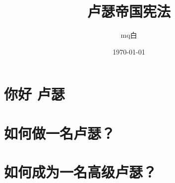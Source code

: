 \documentclass[UTF8,11pt,a4paper]{ctexart}
\title{卢瑟帝国宪法 }
\author{mq白}
\date{\today}
\begin{document}
\maketitle

\section{你好 卢瑟}



\section{如何做一名卢瑟？}



\section{如何成为一名高级卢瑟？}


\end{document}
